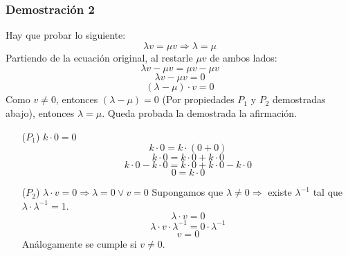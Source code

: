 \documentclass[a4paper,12pt]{article}
\begin{document}
\subsubsection{Demostración 2}
Hay que probar lo siguiente:
$$
\lambda v= \mu v \Rightarrow \lambda=\mu
$$
Partiendo de la ecuación original, al restarle $\mu v$ de ambos lados:
$$
\lambda v - \mu v = \mu v - \mu v
$$
$$
\lambda v - \mu v = 0
$$
$$
(\lambda - \mu ) \cdot v = 0
$$
Como $v\neq 0$, entonces $(\lambda - \mu )=0$ (Por propiedades $P_1$ y $P_2$ demostradas abajo), entonces $\lambda = \mu$. Queda probada la demostrada la afirmación.
\begin{itemize}
    \item[($P_1$)] \textbf{$k\cdot 0 = 0$}
    $$
    k \cdot 0 = k \cdot (0+0)
    $$
    $$
    k \cdot 0 = k \cdot 0 + k \cdot 0
    $$
    $$
    k\cdot 0 - k\cdot 0 = k \cdot 0 + k \cdot 0 - k \cdot 0
    $$
    $$
    0 = k\cdot 0
    $$
    \item[($P_2$)] \textbf{$\lambda \cdot v = 0 \Rightarrow \lambda = 0 \vee v = 0$} \newline
    Supongamos que $\lambda \neq 0 \Rightarrow$ existe $\lambda^{-1}$ tal que $\lambda \cdot \lambda^{-1} = 1$.
    $$
    \lambda \cdot v = 0
    $$
    $$
    \lambda \cdot v \cdot \lambda^{-1} = 0 \cdot \lambda^{-1}
    $$
    $$
    v = 0
    $$
    Análogamente se cumple si $v\neq 0$.
    
\end{itemize}
\end{document}
